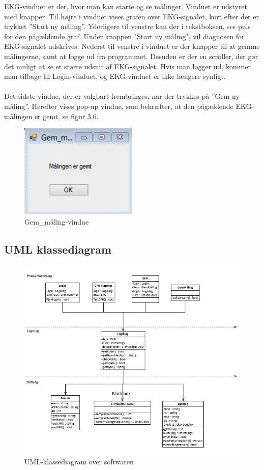 EKG-vinduet er der, hvor man kan starte og se målinger. Vinduet er udstyret med knapper. Til højre i vinduet vises grafen over EKG-signalet, kort efter der er trykket ”Start ny måling”. Yderligere til venstre kan der i tekstboksen, ses puls for den pågældende graf. Under knappen "Start ny måling", vil diagnosen for EKG-signalet udskrives. Nederst til venstre i vinduet er der knapper til at gemme målingerne, samt at logge ud fra programmet. Desuden er der en scroller, der gør det muligt at se et større udsnit af EKG-signalet. Hvis man logger ud, kommer man tilbage til Login-vinduet, og EKG-vinduet er ikke længere synligt. 
\\
\\
Det sidste vindue, der er valgbart frembringes, når der trykkes på ”Gem ny måling”. Herefter vises pop-up vindue, som bekræfter, at den pågældende EKG-målingen er gemt, se figur 3.6. 

\begin{figure}[H]
	\centering
	\includegraphics[width=0.5\textwidth]{Figurer/Snip20150430_41}
	\caption{Gem\_måling-vindue}
\end{figure}

\subsection{UML klassediagram}

\begin{figure}[H]
	\centering
	\includegraphics[width=1\textwidth]{Figurer/Snip20150527_29}
	\caption{UML-klassediagram over softwaren}
\end{figure}

